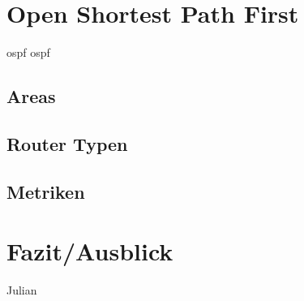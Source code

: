 \documentclass[1pt,a4paper,final]{article}
\begin{document}
\section{Open Shortest Path First}
\ac{ospf} \ac{ospf}
\subsection{Areas}
\subsection{Router Typen}
\subsection{Metriken}
\section{Fazit/Ausblick}
Julian

\clearpage
\nocite{*}
\printbibliography
\end{document}
